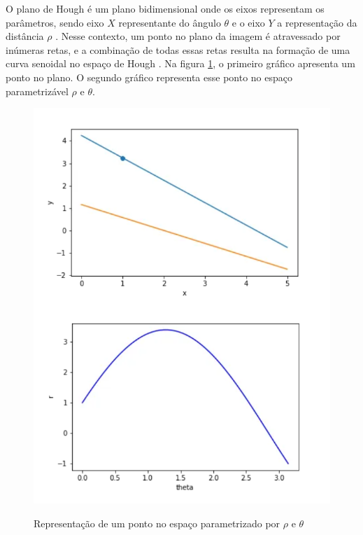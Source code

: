 O plano de Hough é um plano bidimensional onde os eixos representam os parâmetros, sendo eixo $X$ representante do ângulo $\theta$ e o eixo $Y$ a representação da distância $\rho$ \cite{transformadaHough1}. Nesse contexto, um ponto no plano da imagem é atravessado por inúmeras retas, e a combinação de todas essas retas resulta na formação de uma curva senoidal no espaço de Hough \cite{detectBar}. Na figura \ref{fig:Representacao de um ponto no espaco parametrizavel}, o primeiro gráfico apresenta um ponto no plano. O segundo gráfico representa esse ponto no espaço parametrizável $\rho$ e $\theta$.

\begin{figure}[H]
	\centering
    \caption{Representação de um ponto no espaço parametrizado por $\rho$ e $\theta$}
	\includegraphics[scale=0.5]{figuras/math/pontoEspacoParametrizavel.png}
	\label{fig:Representacao de um ponto no espaco parametrizavel}
\end{figure}

